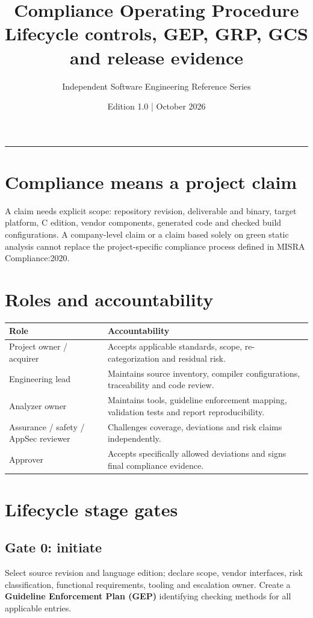 \documentclass[10pt,letterpaper]{article}
\title{\vspace{-2.3em}\color{DeepNavy}\Huge\bfseries Compliance Operating Procedure\\[0.45em]\large\normalfont\color{Teal} Lifecycle controls, GEP, GRP, GCS and release evidence}
\author{Independent Software Engineering Reference Series}
\date{Edition 1.0 \quad | \quad October 2026}
\begin{document}
\maketitle
\vspace{-0.4em}
\begin{center}\color{Slate}\rule{0.83\linewidth}{0.4pt}\end{center}
\DocNotes
\tableofcontents
\newpage

\section{Compliance means a project claim}
A claim needs explicit scope: repository revision, deliverable and binary, target platform, C edition, vendor components, generated code and checked build configurations. A company-level claim or a claim based solely on green static analysis cannot replace the project-specific compliance process defined in MISRA Compliance:2020.
\section{Roles and accountability}
\begin{tabularx}{\linewidth}{@{}p{.28\linewidth}X@{}}\toprule
Role & Accountability\\\midrule
Project owner / acquirer & Accepts applicable standards, scope, re-categorization and residual risk.\\
Engineering lead & Maintains source inventory, compiler configurations, traceability and code review.\\
Analyzer owner & Maintains tools, guideline enforcement mapping, validation tests and report reproducibility.\\
Assurance / safety / AppSec reviewer & Challenges coverage, deviations and risk claims independently.\\
Approver & Accepts specifically allowed deviations and signs final compliance evidence.\\\bottomrule\end{tabularx}
\section{Lifecycle stage gates}
\subsection{Gate 0: initiate}
Select source revision and language edition; declare scope, vendor interfaces, risk classification, functional requirements, tooling and escalation owner. Create a \textbf{Guideline Enforcement Plan (GEP)} identifying checking methods for all applicable entries.
\end{document}
